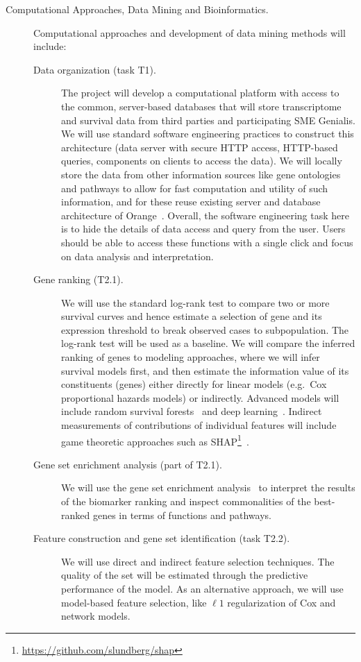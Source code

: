 \documentclass[11pt,a4paper]{article}
\newcommand{\myurl}[1]{\footnote{\url{#1}}}
\begin{document}
\begin{description}
	\item[Computational Approaches, Data Mining and Bioinformatics.] Computational approaches and development of data mining methods will include:
	\begin{description}
		\item[Data organization (task T1).] The project will develop a computational platform with access to the common, server-based databases that will store transcriptome and survival data from third parties and participating SME Genialis. We will use standard software engineering practices to construct this architecture (data server with secure HTTP access, HTTP-based queries, components on clients to access the data). We will locally store the data from other information sources like gene ontologies and pathways to allow for fast computation and utility of such information, and for these reuse existing server and database architecture of Orange~\cite{Demsar2013,Curk2005,Godec2019}. Overall, the software engineering task here is to hide the details of data access and query from the user. Users should be able to access these functions with a single click and focus on data analysis and interpretation.
		\item[Gene ranking (T2.1).] We will use the standard log-rank test to compare two or more survival curves and hence estimate a selection of gene and its expression threshold to break observed cases to subpopulation. The log-rank test will be used as a baseline. We will compare the inferred ranking of genes to modeling approaches, where we will infer survival models first, and then estimate the information value of its constituents (genes) either directly for linear models (e.g.~Cox proportional hazards models) or indirectly. Advanced models will include random survival forests~\cite{22088987} and deep learning~\cite{katzman2018deepsurv,ching2018cox}. Indirect measurements of contributions of individual features will include game theoretic approaches such as SHAP\myurl{https://github.com/slundberg/shap}~\cite{32607472}.
		\item[Gene set enrichment analysis (part of T2.1).] We will use the gene set enrichment analysis~\cite{1239896} to interpret the results of the biomarker ranking and inspect commonalities of the best-ranked genes in terms of functions and pathways.
		\item[Feature construction and gene set identification (task T2.2).] We will use direct and indirect feature selection techniques.  The quality of the set will be estimated through the predictive performance of the model. As an alternative approach, we will use model-based feature selection, like $\ell 1$ regularization of Cox and network models.

\end{description}
\end{description}
\end{document}
